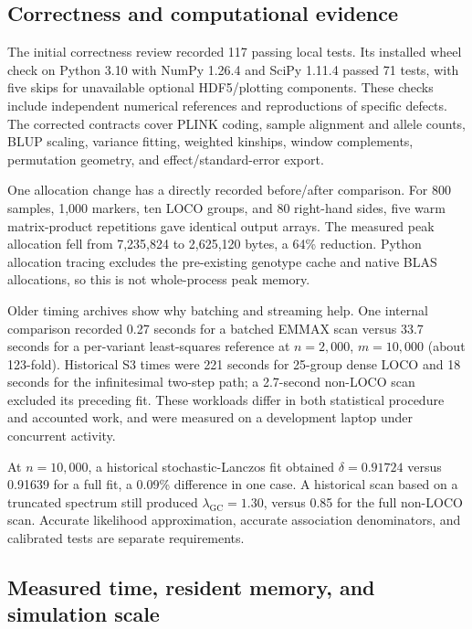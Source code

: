 \documentclass[11pt]{article}
\newcommand{\lgc}{\lambda_{\mathrm{GC}}}
\begin{document}
\subsection{Correctness and computational evidence}
\label{sec:computation}

The initial correctness review recorded 117 passing local tests. Its installed
wheel check on Python 3.10 with NumPy 1.26.4 and SciPy 1.11.4 passed
71 tests, with five skips for unavailable optional HDF5/plotting
components. These checks include independent numerical references and
reproductions of specific defects. The corrected contracts cover PLINK
coding, sample alignment and allele counts, BLUP scaling, variance
fitting, weighted kinships, window complements, permutation geometry,
and effect/standard-error export.

One allocation change has a directly recorded before/after comparison.
For 800 samples, 1,000 markers, ten LOCO groups, and 80 right-hand sides,
five warm matrix-product repetitions gave identical output arrays.
The measured peak allocation fell from 7,235,824 to 2,625,120 bytes,
a 64\% reduction. Python allocation tracing excludes the pre-existing
genotype cache and native BLAS allocations, so this is not whole-process
peak memory.

Older timing archives show why batching and streaming help. One internal comparison
recorded 0.27 seconds for a batched EMMAX scan versus 33.7 seconds for
a per-variant least-squares reference at $n=2,000$, $m=10,000$ (about
123-fold). Historical S3 times were 221 seconds for 25-group dense
LOCO and 18 seconds for the infinitesimal two-step path; a 2.7-second
non-LOCO scan excluded its preceding fit. These workloads differ in
both statistical procedure and accounted work, and were measured on
a development laptop under concurrent activity.

At $n=10,000$, a historical stochastic-Lanczos fit obtained
$\delta=0.91724$ versus 0.91639 for a full fit, a 0.09\% difference in
one case. A historical scan based on a truncated spectrum still produced
$\lgc=1.30$, versus 0.85 for the full non-LOCO scan. Accurate likelihood
approximation, accurate association denominators, and calibrated tests
are separate requirements.

\subsection{Measured time, resident memory, and simulation scale}
\label{sec:phensim-resources}
\end{document}
